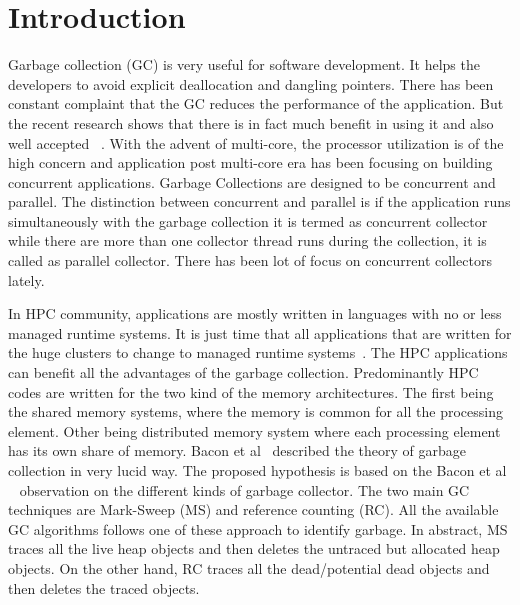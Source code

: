 \section{Introduction}
Garbage collection (GC) is very useful for software development. It helps the developers to avoid explicit deallocation and dangling pointers. There has been constant complaint that the GC reduces the performance of the application. But the recent research shows that there is in fact much benefit in using it and also well accepted ~\cite{Butters2007}. With the advent of multi-core, the processor utilization is of the high concern and application post multi-core era has been focusing on building concurrent applications. Garbage Collections are designed to be concurrent and parallel. The distinction between concurrent and parallel is if the application runs simultaneously with the garbage collection it is termed as concurrent collector while there are more than one collector thread runs during the collection, it is called as parallel collector. There has been lot of focus on concurrent collectors lately. 

In HPC community, applications are mostly written in languages with no or less managed runtime systems. It is just time that all applications that are written for the huge clusters to change to managed runtime systems~\cite{Endo,APPELSGC}. The HPC applications can benefit all the advantages of the garbage collection. Predominantly HPC codes are written for the two kind of the memory architectures. The first being the shared memory systems, where the memory is common for all the processing element. Other being distributed memory system where each processing element has its own share of memory. Bacon et al~\cite{BaconUTGC} described the theory of garbage collection in very lucid way. The proposed hypothesis is based on the Bacon et al ~\cite{BaconUTGC} observation on the different kinds of garbage collector. The two main GC techniques are Mark-Sweep (MS) and reference counting (RC). All the available GC algorithms follows one of these approach to identify garbage. In abstract, MS traces all the live heap objects and then deletes the untraced but allocated heap objects. On the other hand, RC traces all the dead/potential dead objects and then deletes the traced objects. 

